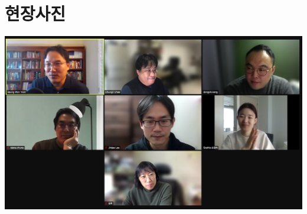 \documentclass[
]{book}
\begin{document}
\hypertarget{uxd604uxc7a5uxc0acuxc9c4}{%
\section{현장사진}\label{uxd604uxc7a5uxc0acuxc9c4}}

\includegraphics{img/session1.png}

\printbibliography
\end{document}
